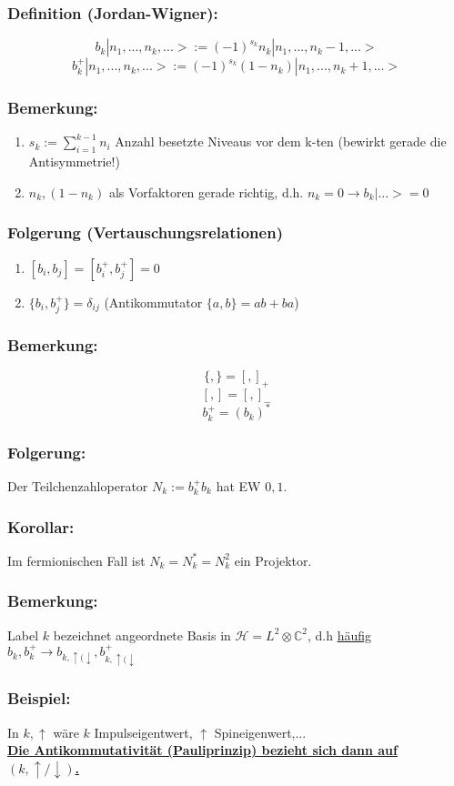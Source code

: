 \documentclass[twoside,a4paper]{scrartcl}
\newcommand{\C}{\mathbb{C}}
\renewcommand{\1}{\mathds{1}}
\newcommand{\ra}{\rightarrow}
\renewcommand{\H}{\mathcal{H}}
\renewcommand{\C}{\mathbb{C}}
\begin{document}
\subsubsection*{Definition (Jordan-Wigner):}
$$b_k|n_1,...,n_k,...>:=(-1)^{s_k} n_k|n_1,...,n_k-1,...>$$
$$b_k^+|n_1,...,n_k,...>:=(-1)^{s_k} (1-n_k)|n_1,...,n_k+1,...>$$
\subsubsection*{Bemerkung:}
\begin{enumerate}
\item $s_k:=\sum_{i=1}^{k-1} n_i$ Anzahl besetzte Niveaus vor dem k-ten (bewirkt gerade die Antisymmetrie!)
\item $n_k,(1-n_k)$ als Vorfaktoren gerade richtig, d.h. $n_k=0 \ra b_k|...>=0$
\end{enumerate}
\subsubsection*{Folgerung (Vertauschungsrelationen)} 
 \begin{enumerate}
\item $[b_i,b_{j}]=[b_i^+,b_{j}^+]=0$
\item $\{b_i,b_j^+\}=\delta_{ij}$ (Antikommutator $\{a,b\}=ab+ba$)
\end{enumerate}
\subsubsection*{Bemerkung:}
$$\{,\}=[,]_+$$
$$[,]=[,]_-$$
$$b_k^+=(b_k)^*$$
\subsubsection*{Folgerung:}
Der Teilchenzahloperator $N_k:=b_k^+b_k$ hat EW $0,1$.
\subsubsection*{Korollar:}
Im fermionischen Fall ist $N_k=N_k^*=N_k^2$ ein Projektor.
\subsubsection*{Bemerkung:}
Label $k$ bezeichnet angeordnete Basis in $\H=L^2 \otimes \C^2$, d.h \underline{häufig} $b_k,b_k^+ \ra b_{k,\uparrow(\downarrow},b_{k,\uparrow(\downarrow}^+$
\subsubsection*{Beispiel:}
In $k,\uparrow$ wäre $k$ Impulseigentwert, $\uparrow$ Spineigenwert,...\\
\underline{\textbf{Die Antikommutativität (Pauliprinzip) bezieht sich dann auf $(k,\uparrow/\downarrow)$.}}
\end{document}
